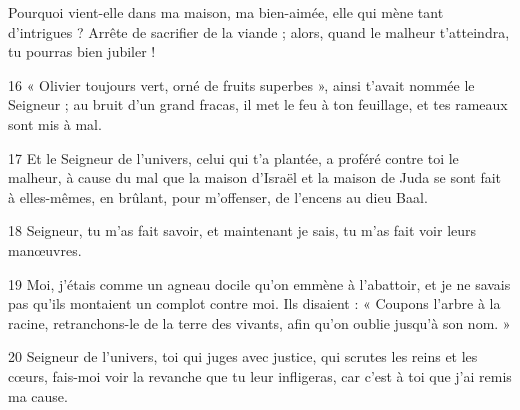 Pourquoi vient-elle dans ma maison, ma bien-aimée, elle qui mène tant d’intrigues ? Arrête de sacrifier de la viande ; alors, quand le malheur t’atteindra, tu pourras bien jubiler !

16 « Olivier toujours vert, orné de fruits superbes », ainsi t’avait nommée le Seigneur ; au bruit d’un grand fracas, il met le feu à ton feuillage, et tes rameaux sont mis à mal.

17 Et le Seigneur de l’univers, celui qui t’a plantée, a proféré contre toi le malheur, à cause du mal que la maison d’Israël et la maison de Juda se sont fait à elles-mêmes, en brûlant, pour m’offenser, de l’encens au dieu Baal.

18  Seigneur, tu m’as fait savoir, et maintenant je sais, tu m’as fait voir leurs manœuvres.

19 Moi, j’étais comme un agneau docile qu’on emmène à l’abattoir, et je ne savais pas qu’ils montaient un complot contre moi. Ils disaient : « Coupons l’arbre à la racine, retranchons-le de la terre des vivants, afin qu’on oublie jusqu’à son nom. »

20 Seigneur de l’univers, toi qui juges avec justice, qui scrutes les reins et les cœurs, fais-moi voir la revanche que tu leur infligeras, car c’est à toi que j’ai remis ma cause.